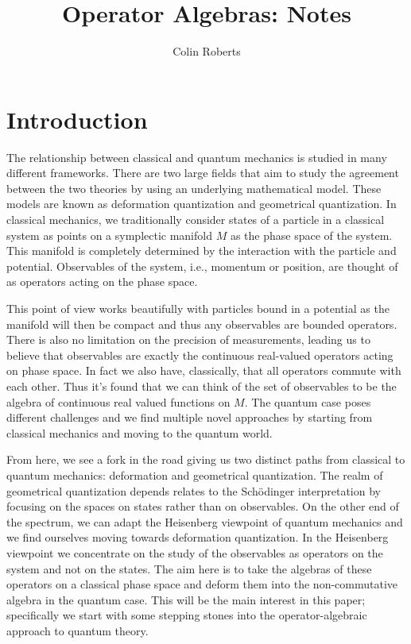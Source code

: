 \documentclass[leqno]{article}
\author{Colin Roberts}
\title{Operator Algebras: Notes}
\theoremstyle{definition}
\theoremstyle{remark}
\theoremstyle{theorem}
\begin{document}
\maketitle
\tableofcontents

\section{Introduction}

The relationship between classical and quantum mechanics is studied in many different frameworks. There are two large fields that aim to study the agreement between the two theories by using an underlying mathematical model.  These models are known as deformation quantization and geometrical quantization.  In classical mechanics, we traditionally consider states of a particle in a classical system as points on a symplectic manifold $M$ as the phase space of the system.  This manifold is completely determined by the interaction with the particle and potential.  Observables of the system, i.e., momentum or position, are thought of as operators acting on the phase space.

This point of view works beautifully with particles bound in a potential as the manifold will then be compact and thus any observables are bounded operators. There is also no limitation on the precision of measurements, leading us to believe that observables are exactly the continuous real-valued operators acting on phase space.  In fact we also have, classically, that all operators commute with each other.  Thus it's found that we can think of the set of observables to be the algebra of continuous real valued functions on $M$.  The quantum case poses different challenges and we find multiple novel approaches by starting from classical mechanics and moving to the quantum world.

From here, we see a fork in the road giving us two distinct paths from classical to quantum mechanics: deformation and geometrical quantization.  The realm of geometrical quantization depends relates to the Sch{\"o}dinger interpretation by focusing on the spaces on states rather than on observables.  On the other end of the spectrum, we can adapt the Heisenberg viewpoint of quantum mechanics and we find ourselves moving towards deformation quantization.  In the Heisenberg viewpoint we concentrate on the study of the observables as operators on the system and not on the states.  The aim here is to take the algebras of these operators on a classical phase space and deform them into the non-commutative algebra in the quantum case.  This will be the main interest in this paper; specifically we start with some stepping stones into the operator-algebraic approach to quantum theory. 
\end{document}
